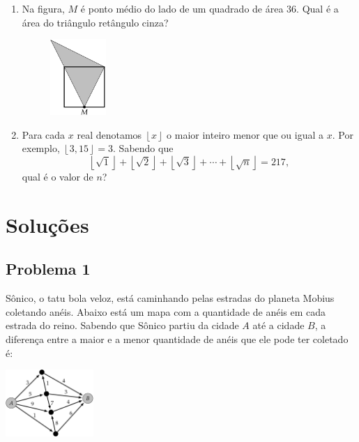 \documentclass[12pt]{article}
\newcommand{\kb}[1]{\left\lfloor #1 \right\rfloor}
\begin{document}
\begin{enumerate}[label=\textbf{\arabic*.}]
      \item Na figura, $M$ é ponto médio do lado de um quadrado de área $36$. Qual é a área do triângulo retângulo cinza? \\
        \begin{figure}[h]
          \centering
          \includegraphics[width=0.2\textwidth]{fifth.png}
        \end{figure}

      \item Para cada $x$ real denotamos $\kb{x}$ o maior inteiro menor que ou igual a $x$. Por exemplo, $\kb{3{,}15}=3$. Sabendo que
        \[
          \kb{\sqrt{1}}+\kb{\sqrt{2}}+\kb{\sqrt{3}}+\cdots+\kb{\sqrt{n}}=217,
        \]
        qual é o valor de $n$? \\

      \end{enumerate}

  \clearpage

  \section{\textsf{Soluções}}
    \subsection{Problema 1}
      \begin{tcolorbox}[statementbox]
        Sônico, o tatu bola veloz, está caminhando pelas estradas do planeta Mobius coletando anéis. Abaixo está um mapa com a
        quantidade de anéis em cada estrada do reino. Sabendo que Sônico partiu da cidade $A$ até a cidade $B$, a diferença entre a maior
        e a menor quantidade de anéis que ele pode ter coletado é:
        \begin{center}
          \includegraphics[width=0.25\textwidth]{first.png}
        \end{center}
      \end{tcolorbox}
\end{document}
